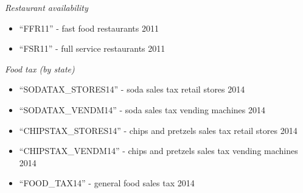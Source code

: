 \documentclass{article}
\begin{document}
\begin{itemize}[leftmargin=0pt]
\begin{enumerate}
        \textit{Restaurant availability}
        \begin{itemize}
            \item[] “FFR11” - fast food restaurants 2011
            \item[] “FSR11” - full service restaurants 2011
        \end{itemize}
        
        \textit{Food tax (by state)}
        \begin{itemize}
            \item[] “SODATAX\_STORES14” - soda sales tax retail stores 2014
            \item[] “SODATAX\_VENDM14” - soda sales tax vending machines 2014
            \item[] “CHIPSTAX\_STORES14” - chips and pretzels sales tax retail stores 2014
            \item[] “CHIPSTAX\_VENDM14” - chips and pretzels sales tax vending machines 2014
            \item[] “FOOD\_TAX14” - general food sales tax 2014
        \end{itemize}


\end{enumerate}
\end{itemize}
\end{document}
